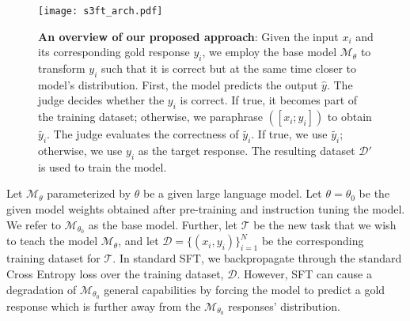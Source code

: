 \newcommand{\model}{\mathcal{M}}
\newcommand{\basemodel}{\mathcal{M}_{\theta_0}}

\newcommand{\task}{\mathcal{T}}
\newcommand{\traindata}{\mathcal{D}}
\newcommand{\inp}{x}
\newcommand{\outp}{y}
\newcommand{\loss}{\mathcal{L}}
\newcommand{\sftloss}{\mathcal{L}_{SFT}}
\newcommand{\prob}{Pr}
\newcommand{\pred}{\hat{y}}
\newcommand{\etc}{\emph{etc.}}
\newcommand{\goodsubset}{\mathcal{R}}
\newcommand{\goldsubset}{\mathcal{G}}

\newcommand{\ssrloss}{\mathcal{L}_{SSR}}


\begin{figure*}
    \centering
    \texttt{[image: s3ft\_arch.pdf]}
    \caption{\textbf{An overview of our proposed approach}: Given the input $\inp_i$ and its corresponding gold response $\outp_i$, we employ the base model $\mathcal{M}_{\theta}$ to transform $\outp_i$ such that it is correct but at the same time closer to model's distribution. First, the model predicts the output $\hat{y}$. The judge decides whether the $\outp_i$ is correct. If true, it becomes part of the training dataset; otherwise, we paraphrase $([x_i;y_i])$ to obtain $\tilde{y_i}$. The judge evaluates the correctness of $\tilde{y_i}$. If true, we use $\tilde{y_i}$; otherwise, we use $\outp_i$ as the target response. The resulting dataset $\mathcal{D'}$ is used to train the model.}
    \label{fig:overview}
    \vspace{-0.5em}
\end{figure*}

Let $\model_\theta$ parameterized by $\theta$ be a given large language model. 
Let $\theta = \theta_0$ be the given model weights obtained after pre-training and instruction tuning the model.
We refer to $\model_{\theta_0}$ as the base model.
Further, let $\task$ be the new task that we wish to teach the model $\model_\theta$, and let $\traindata = \{(\inp_i, \outp_i)\}_{i = 1}^{N}$ be the corresponding training dataset for $\task$.
In standard SFT, we backpropagate through the standard Cross Entropy loss over the training dataset, $\traindata$.
However, SFT can cause a degradation of $\model_{\theta_0}$ general capabilities by forcing the model to predict a gold response which is further away from the $\mathcal{M}_{\theta_0}$ responses' distribution.

